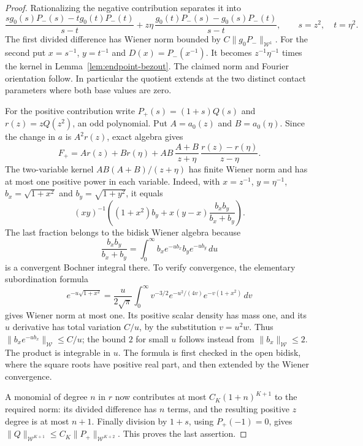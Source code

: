 \documentclass[11pt]{article}
\begin{document}
\begin{proof}
Rationalizing the negative contribution separates it into
\[
 \frac{s g_0(s)P_-(s)-t g_0(t)P_-(t)}{s-t}
 +z\eta\,\frac{g_0(t)P_-(s)-g_0(s)P_-(t)}{s-t},
 \qquad s=z^2,\quad t=\eta^2.
\]
The first divided difference has Wiener norm bounded by
$C\|g_0P_-\|_{\mathcal W^1}$. For the second put
$x=s^{-1}$, $y=t^{-1}$ and $D(x)=P_-(x^{-1})$.
It becomes $z^{-1}\eta^{-1}$ times the kernel in
Lemma~\ref{lem:endpoint-bezout}. The claimed norm and Fourier
orientation follow. In particular the quotient extends at the
two distinct contact parameters where both base values are zero.

For the positive contribution write $P_+(s)=(1+s)Q(s)$ and
$r(z)=zQ(z^2)$, an odd polynomial. Put $A=a_0(z)$ and $B=a_0(\eta)$.
Since the change in $a$ is $A^2r(z)$, exact algebra gives
\[
 F_+=A r(z)+B r(\eta)
   +AB\,\frac{A+B}{z+\eta}\,
                   \frac{r(z)-r(\eta)}{z-\eta}.
\]
The two-variable kernel $AB(A+B)/(z+\eta)$ has finite Wiener
norm and has at most one positive power in each variable.
Indeed, with $x=z^{-1}$, $y=\eta^{-1}$,
$b_x=\sqrt{1+x^2}$ and $b_y=\sqrt{1+y^2}$, it equals
\[
 (xy)^{-1}\left((1+x^2)b_y
       +x(y-x)\frac{b_xb_y}{b_x+b_y}\right).
\]
The last fraction belongs to the bidisk Wiener algebra because
\[
 \frac{b_xb_y}{b_x+b_y}
   =\int_0^\infty b_xe^{-ub_x}b_ye^{-ub_y}\,du
\]
is a convergent Bochner integral there. To verify convergence,
the elementary subordination formula
\[
 e^{-u\sqrt{1+x^2}}
 =\frac{u}{2\sqrt\pi}\int_0^\infty
       v^{-3/2}e^{-u^2/(4v)}e^{-v(1+x^2)}\,dv
\]
gives Wiener norm at most one. Its positive scalar density has
mass one, and its $u$ derivative has total variation $C/u$,
by the substitution $v=u^2w$. Thus
$\|b_xe^{-ub_x}\|_{\mathcal W}\le C/u$; the bound $2$ for
small $u$ follows instead from $\|b_x\|_{\mathcal W}\le2$.
The product is integrable in $u$. The formula is first checked
in the open bidisk, where the square roots have positive real
part, and then extended by the Wiener convergence.

A monomial of degree $n$ in $r$ now contributes at most
$C_K(1+n)^{K+1}$ to the required norm: its divided difference
has $n$ terms, and the resulting positive $z$ degree is at
most $n+1$. Finally division by $1+s$, using $P_+(-1)=0$,
gives $\|Q\|_{\mathcal W^{K+1}}\le
C_K\|P_+\|_{\mathcal W^{K+2}}$. This proves the last assertion.
\end{proof}
\end{document}

